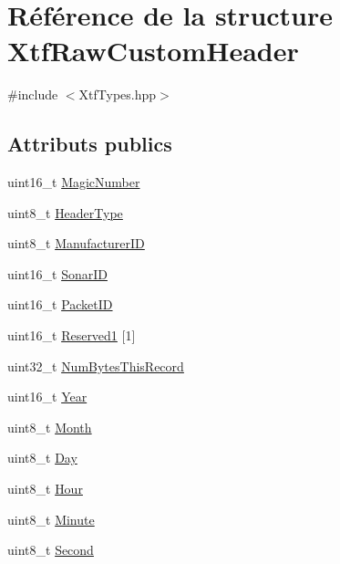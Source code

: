 \hypertarget{structXtfRawCustomHeader}{}\section{Référence de la structure Xtf\+Raw\+Custom\+Header}
\label{structXtfRawCustomHeader}


{\ttfamily \#include $<$Xtf\+Types.\+hpp$>$}

\subsection*{Attributs publics}
\begin{DoxyCompactItemize}
\item 
uint16\+\_\+t \hyperlink{structXtfRawCustomHeader_a126438a1124df75c7c72fb3fe454a8b4}{Magic\+Number}
\item 
uint8\+\_\+t \hyperlink{structXtfRawCustomHeader_a39a8c5a2cf24296ed2a12bace730b41f}{Header\+Type}
\item 
uint8\+\_\+t \hyperlink{structXtfRawCustomHeader_a345cfe92f0381a01ca7f4f71a411d29e}{Manufacturer\+ID}
\item 
uint16\+\_\+t \hyperlink{structXtfRawCustomHeader_ada0349f48eef25870e24aaa5f5b46614}{Sonar\+ID}
\item 
uint16\+\_\+t \hyperlink{structXtfRawCustomHeader_a484ac07bbf72c04d955ac1314f62aaad}{Packet\+ID}
\item 
uint16\+\_\+t \hyperlink{structXtfRawCustomHeader_a157f42ae5caf3892d3e9352b593d7e50}{Reserved1} \mbox{[}1\mbox{]}
\item 
uint32\+\_\+t \hyperlink{structXtfRawCustomHeader_a98e261348a9618e2fc2088e6c92e5ee3}{Num\+Bytes\+This\+Record}
\item 
uint16\+\_\+t \hyperlink{structXtfRawCustomHeader_a144ce6ccb291675a42ba82b6bf3618d9}{Year}
\item 
uint8\+\_\+t \hyperlink{structXtfRawCustomHeader_ada2f69f0a0813941c9e4029fa6547135}{Month}
\item 
uint8\+\_\+t \hyperlink{structXtfRawCustomHeader_a720d7963dfa30cde7f12478e42009dbf}{Day}
\item 
uint8\+\_\+t \hyperlink{structXtfRawCustomHeader_a16e39cd2fe92a9e75199061179e0656b}{Hour}
\item 
uint8\+\_\+t \hyperlink{structXtfRawCustomHeader_a0294622a0cc26d6e8c666a819dde32b2}{Minute}
\item 
uint8\+\_\+t \hyperlink{structXtfRawCustomHeader_ada441d8e9b505432a43ff3d48b785177}{Second}

\end{DoxyCompactItemize}
